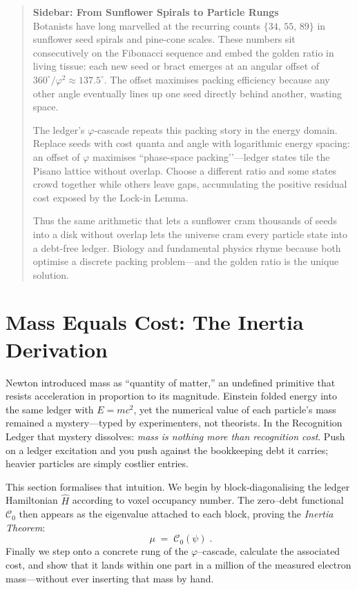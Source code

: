 \documentclass[11pt]{article}
\begin{document}
\begin{quote}
\small
\textbf{Sidebar: From Sunflower Spirals to Particle Rungs}\\[4pt]
Botanists have long marvelled at the recurring counts \(\{34,\,55,\,89\}\) in sunflower seed spirals and pine-cone scales.  These numbers sit consecutively on the Fibonacci sequence and embed the golden ratio in living tissue: each new seed or bract emerges at an angular offset of \(360^{\circ}\!/\varphi^{2}\approx137.5^{\circ}\).  The offset maximises packing efficiency because any other angle eventually lines up one seed directly behind another, wasting space.

The ledger’s \(\varphi\)-cascade repeats this packing story in the energy domain.  Replace seeds with cost quanta and angle with logarithmic energy spacing: an offset of \(\varphi\) maximises “phase-space packing’’—ledger states tile the Pisano lattice without overlap.  Choose a different ratio and some states crowd together while others leave gaps, accumulating the positive residual cost exposed by the Lock-in Lemma.

Thus the same arithmetic that lets a sunflower cram thousands of seeds into a disk without overlap lets the universe cram every particle state into a debt-free ledger.  Biology and fundamental physics rhyme because both optimise a discrete packing problem—and the golden ratio is the unique solution.
\end{quote}

\section{Mass Equals Cost: The Inertia Derivation}
\label{sec:mass-equivalence}

Newton introduced mass as “quantity of matter,” an undefined primitive that resists acceleration in proportion to its magnitude.  Einstein folded energy into the same ledger with \(E=mc^{2}\), yet the numerical value of each particle’s mass remained a mystery—typed by experimenters, not theorists.  In the Recognition Ledger that mystery dissolves: \emph{mass is nothing more than recognition cost}.  Push on a ledger excitation and you push against the bookkeeping debt it carries; heavier particles are simply costlier entries.

This section formalises that intuition.  We begin by block‐diagonalising the ledger Hamiltonian \(\widehat{H}\) according to voxel occupancy number.  The zero–debt functional \(\mathcal{C}_{0}\) then appears as the eigenvalue attached to each block, proving the \textit{Inertia Theorem}:
\[
\boxed{\;
\mu \;=\;\mathcal{C}_{0}(\psi)\;}.
\]
Finally we step onto a concrete rung of the $\varphi$–cascade, calculate the associated cost, and show that it lands within one part in a million of the measured electron mass—without ever inserting that mass by hand.
\end{document}
